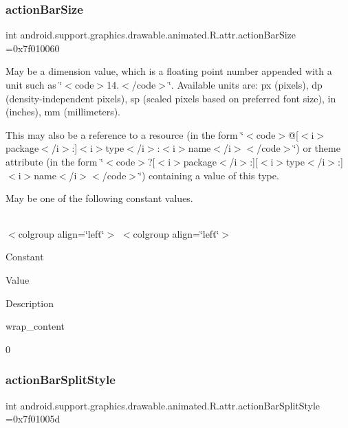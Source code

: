 \subsubsection{\texorpdfstring{action\+Bar\+Size}{actionBarSize}}
{\footnotesize\ttfamily int android.\+support.\+graphics.\+drawable.\+animated.\+R.\+attr.\+action\+Bar\+Size =0x7f010060\hspace{0.3cm}{\ttfamily [static]}}

May be a dimension value, which is a floating point number appended with a unit such as \char`\"{}$<$code$>$14.\+5sp$<$/code$>$\char`\"{}. Available units are\+: px (pixels), dp (density-\/independent pixels), sp (scaled pixels based on preferred font size), in (inches), mm (millimeters). 

This may also be a reference to a resource (in the form \char`\"{}$<$code$>$@\mbox{[}$<$i$>$package$<$/i$>$\+:\mbox{]}$<$i$>$type$<$/i$>$\+:$<$i$>$name$<$/i$>$$<$/code$>$\char`\"{}) or theme attribute (in the form \char`\"{}$<$code$>$?\mbox{[}$<$i$>$package$<$/i$>$\+:\mbox{]}\mbox{[}$<$i$>$type$<$/i$>$\+:\mbox{]}$<$i$>$name$<$/i$>$$<$/code$>$\char`\"{}) containing a value of this type. 

May be one of the following constant values.

\tabulinesep=1mm
\begin{longtabu} spread 0pt [c]{*{0}{|X[-1]}|}
\hline
\end{longtabu}
$<$colgroup align=\char`\"{}left\char`\"{}$>$ $<$colgroup align=\char`\"{}left\char`\"{}$>$ 

Constant

Value

Description 

{\ttfamily wrap\+\_\+content}

0\mbox{\label{classandroid_1_1support_1_1graphics_1_1drawable_1_1animated_1_1R_1_1attr_adde5fb337c949ec653b61620e12fc314}} 
\subsubsection{\texorpdfstring{action\+Bar\+Split\+Style}{actionBarSplitStyle}}
{\footnotesize\ttfamily int android.\+support.\+graphics.\+drawable.\+animated.\+R.\+attr.\+action\+Bar\+Split\+Style =0x7f01005d\hspace{0.3cm}{\ttfamily [static]}}

